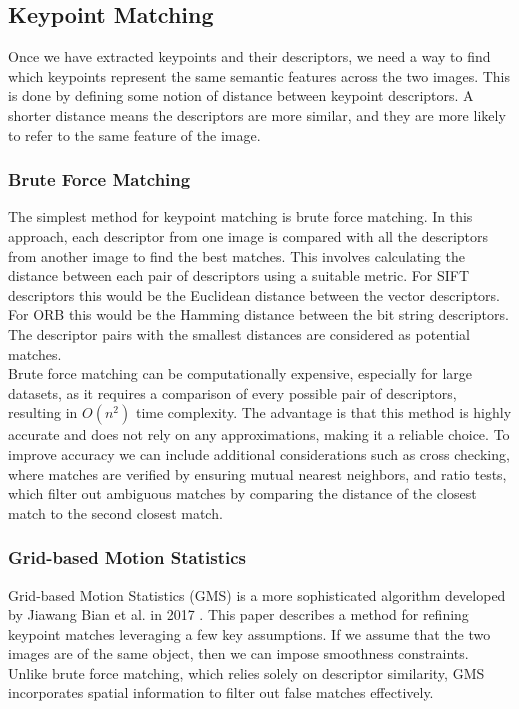 \subsection{Keypoint Matching}
Once we have extracted keypoints and their descriptors, we need a way to find which keypoints represent the same semantic features across the two images. This is done by defining some notion of distance between keypoint descriptors. A shorter distance means the descriptors are more similar, and they are more likely to refer to the same feature of the image.\\

\subsubsection{Brute Force Matching}
The simplest method for keypoint matching is brute force matching. In this approach, each descriptor from one image is compared with all the descriptors from another image to find the best matches. This involves calculating the distance between each pair of descriptors using a suitable metric. For SIFT descriptors this would be the Euclidean distance between the vector descriptors. For ORB this would be the Hamming distance between the bit string descriptors. The descriptor pairs with the smallest distances are considered as potential matches.\\

Brute force matching can be computationally expensive, especially for large datasets, as it requires a comparison of every possible pair of descriptors, resulting in $O(n^2)$ time complexity. The advantage is that this method is highly accurate and does not rely on any approximations, making it a reliable choice. To improve accuracy we can include additional considerations such as cross checking, where matches are verified by ensuring mutual nearest neighbors, and ratio tests, which filter out ambiguous matches by comparing the distance of the closest match to the second closest match.

\subsubsection{Grid-based Motion Statistics}
Grid-based Motion Statistics (GMS) is a more sophisticated algorithm developed by Jiawang Bian et al. in 2017 \cite{GMS}. This paper describes a method for refining keypoint matches leveraging a few key assumptions. If we assume that the two images are of the same object, then we can impose smoothness constraints. Unlike brute force matching, which relies solely on descriptor similarity, GMS incorporates spatial information to filter out false matches effectively.\\

